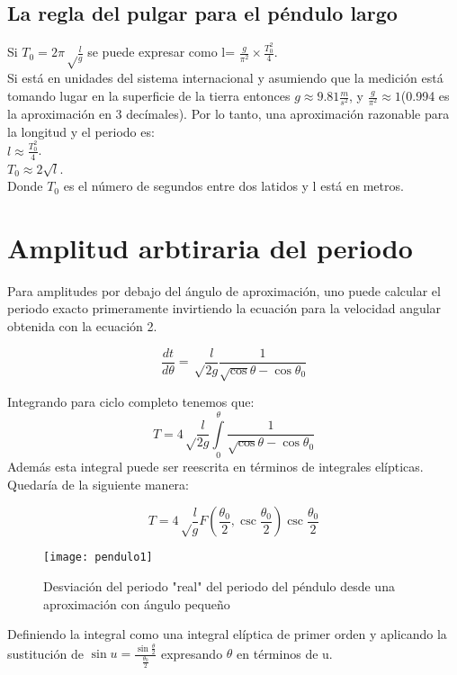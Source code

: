 \documentclass[12pt]{article}
\begin{document}
\subsection{La regla del pulgar para el péndulo largo}

Si $T_0=2\pi \sqrt \frac{l}{g}$ se puede expresar como l= $\frac{g}{\pi^2} \times \frac{T_0^2}{4}$.\\

Si está en unidades del sistema internacional y asumiendo que la medición está tomando lugar en la superficie de la tierra entonces $g \approx 9.81 \frac{m}{s^2}$, y $\frac{g}{\pi^2} \approx 1$(0.994 es la aproximación en 3 decímales). Por lo tanto, una aproximación razonable para la longitud y el periodo es: \\
$l \approx \frac{T_0^2}{4}$.\\
$T_0 \approx 2\sqrt l$. \\
Donde $T_0$ es el número de segundos entre dos latidos y l está en metros.

\section{Amplitud arbtiraria del periodo}

Para amplitudes por debajo del ángulo de aproximación, uno puede calcular el periodo exacto primeramente invirtiendo la ecuación para la velocidad angular obtenida con la ecuación 2.

$$\frac{dt}{d \theta}=\sqrt \frac{l}{2g}\frac{1}{\sqrt \cos\theta-\cos\theta_0}
$$

Integrando para ciclo completo tenemos que:
$$
T=4\sqrt \frac{l}{2g} \int\limits_0^\theta  \frac{1}{\sqrt \cos\theta-\cos\theta_0} 
$$
Además esta integral puede ser reescrita en términos de integrales elípticas. Quedaría de la siguiente manera:


\begin{equation}
T=4\sqrt \frac{l}{g}F\left(\frac{\theta_0}{2}, \csc \frac{\theta_0}{2}\right)\csc\frac{\theta_0}{2}
\end{equation}



\begin{figure}[h!]
\centering
    \texttt{[image: pendulo1]}
    \caption{Desviación del periodo "real" del periodo del péndulo desde una aproximación con ángulo pequeño}
\end{figure} 


Definiendo la integral como una integral elíptica de primer orden y aplicando la sustitución de $\sin u=\frac{\sin\frac{\theta}{2}}{\frac{\theta_0}{2}}$ expresando $\theta$ en términos de u.
\end{document}
